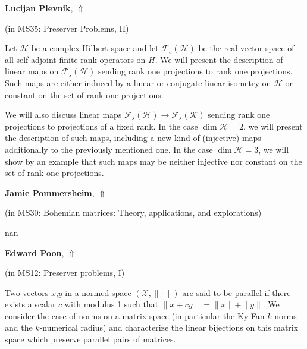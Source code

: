 \documentclass[ILAS2025-program.tex]{subfiles}
\begin{document}
\hypertarget{down0280}{}\begin{ilasabstract}
    
\textbf{Lucijan Plevnik},  \hfill \hyperlink{up0280}{$\Uparrow$}
    
    
(in {\color{mstitle}MS35: Preserver Problems, II})
        
\mtskip
    Let $\mathcal H$ be a complex Hilbert space and let ${\mathcal F}_{s}(\mathcal H)$ be the real vector space of all self-adjoint finite rank operators on $H$.
We will present the description of linear maps on ${\mathcal F}_{s}(\mathcal H)$ sending rank one projections to rank one projections.
Such maps are either induced by a linear or conjugate-linear isometry on $\mathcal H$ or constant on the set of rank one projections.

We will also discuss linear maps ${\mathcal F}_{s}(\mathcal H) \to {\mathcal F}_{s}(\mathcal K)$ sending rank one projections to projections of a fixed rank.
In the case $\dim \mathcal H = 2$, we will present the description of such maps, including a new kind of (injective) maps additionally to the previously mentioned one.
In the case $\dim \mathcal H = 3$, we will show by an example that such maps may be neither injective nor constant on the set of rank one projections.

\end{ilasabstract}
    

\hypertarget{down0229}{}\begin{ilasabstract}
    
\textbf{Jamie Pommersheim},  \hfill \hyperlink{up0229}{$\Uparrow$}
    
    
(in {\color{mstitle}MS30: Bohemian matrices: Theory, applications, and explorations})
        
\mtskip
    nan
\end{ilasabstract}
    

\hypertarget{down0017}{}\begin{ilasabstract}
    
\textbf{Edward Poon},  \hfill \hyperlink{up0017}{$\Uparrow$}
    
    
(in {\color{mstitle}MS12: Preserver problems, I})
        
\mtskip
    Two vectors $x$,$y$ in a normed space $(\mathcal{X}, \| \cdot \|)$ are said to be parallel if there exists a scalar $c$ with modulus 1 such that $\|x+c y\| = \|x\| + \|y\|$.
We consider the case of norms on a matrix space (in particular the Ky Fan $k$-norms and the $k$-numerical radius) and characterize the linear bijections on this matrix space which preserve parallel pairs of matrices.

\end{ilasabstract}
    
\end{document}
